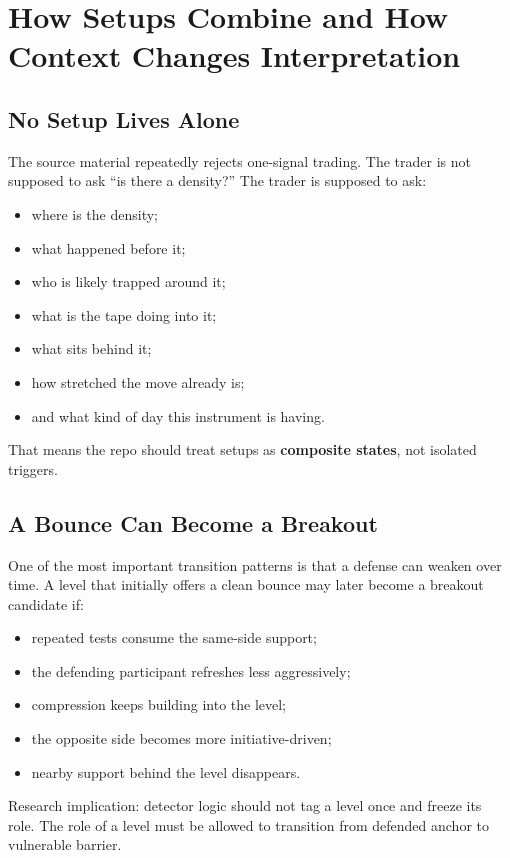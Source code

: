 \section{How Setups Combine and How Context Changes Interpretation}

\subsection{No Setup Lives Alone}

The source material repeatedly rejects one-signal trading.
The trader is not supposed to ask ``is there a density?''
The trader is supposed to ask:
\begin{itemize}
  \item where is the density;
  \item what happened before it;
  \item who is likely trapped around it;
  \item what is the tape doing into it;
  \item what sits behind it;
  \item how stretched the move already is;
  \item and what kind of day this instrument is having.
\end{itemize}

That means the repo should treat setups as \textbf{composite states}, not isolated triggers.

\subsection{A Bounce Can Become a Breakout}

One of the most important transition patterns is that a defense can weaken over time.
A level that initially offers a clean bounce may later become a breakout candidate if:
\begin{itemize}
  \item repeated tests consume the same-side support;
  \item the defending participant refreshes less aggressively;
  \item compression keeps building into the level;
  \item the opposite side becomes more initiative-driven;
  \item nearby support behind the level disappears.
\end{itemize}

Research implication: detector logic should not tag a level once and freeze its role.
The role of a level must be allowed to transition from defended anchor to vulnerable barrier.

